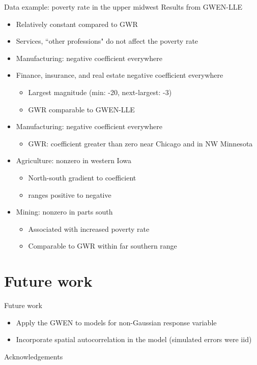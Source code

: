 \documentclass[12pt,t]{beamer}
\newcommand{\subt}[1]{{\footnotesize \color{subtitle} {#1}}}
\begin{document}
\begin{frame}{Data example: poverty rate in the upper midwest}
\subt{Results from GWEN-LLE}

\begin{itemize}
  \item Relatively constant compared to GWR
  \item Services, ``other professions" do not affect the poverty rate
  \item Manufacturing: negative coefficient everywhere
  \item Finance, insurance, and real estate negative coefficient everywhere
  \begin{itemize}
    \item Largest magnitude (min: -20, next-largest: -3)
    \item GWR comparable to GWEN-LLE
  \end{itemize}

  \item Manufacturing: negative coefficient everywhere
  \begin{itemize}
    \item GWR: coefficient greater than zero near Chicago and in NW Minnesota
  \end{itemize}

  \item Agriculture: nonzero in western Iowa
  \begin{itemize}
    \item North-south gradient to coefficient
    \item ranges positive to negative
  \end{itemize}

  \item Mining: nonzero in parts south 
  \begin{itemize}
    \item Associated with increased poverty rate
    \item Comparable to GWR within far southern range
  \end{itemize}
\end{itemize}

\end{frame}


\section{Future work}


\begin{frame}{Future work}
\begin{itemize}
    \item Apply the GWEN to models for non-Gaussian response variable
    \item Incorporate spatial autocorrelation in the model (simulated errors were iid)
\end{itemize}
\end{frame}



\begin{frame}{Acknowledgements}

\end{frame}
\end{document}
